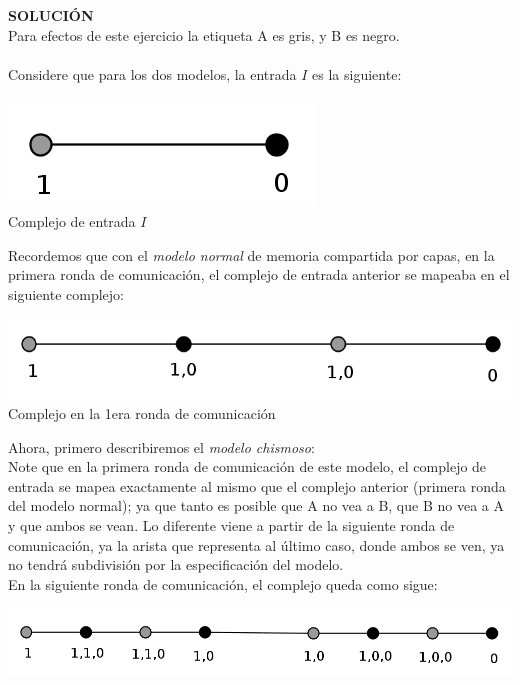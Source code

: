 \documentclass{article}
\begin{document}
\begin{enumerate}
{\begin{enumerate}
        \textbf{SOLUCIÓN}\\
        Para efectos de este ejercicio la etiqueta A es gris, y B es negro.\\\\
        Considere que para los dos modelos, la entrada $I$ es la siguiente:\\
        \begin{center}
        \includegraphics[scale=1.15]{input1a.png}\\
        \scriptsize{Complejo de entrada $I$}\\
        \end{center}
        Recordemos que con el \textit{modelo normal} de memoria compartida por capas,
        en la primera ronda de comunicación, el complejo de entrada anterior se
        mapeaba en el siguiente complejo:
        \begin{center}
        \includegraphics[scale=0.95]{pronda1a.png}\\
        \scriptsize{Complejo en la 1era ronda de comunicación}\\
        \end{center}
        Ahora, primero describiremos el \textit{modelo chismoso}:\\
        Note que en la primera ronda de comunicación de este modelo, el complejo de
        entrada se mapea exactamente al mismo que el complejo anterior (primera ronda del
        modelo normal); ya que tanto es posible que A no vea a B, que B no vea a A y que
        ambos se vean.
        Lo diferente viene a partir de la siguiente ronda de comunicación, ya la arista que
        representa al último caso, donde ambos se ven, ya no tendrá subdivisión por la
        especificación del modelo.\\
        En la siguiente ronda de comunicación, el complejo queda como sigue:
        \begin{center}
        \includegraphics[scale=0.95]{srondachismoso1a.png}\\

\end{center}
\end{enumerate}}
\end{enumerate}
\end{document}
